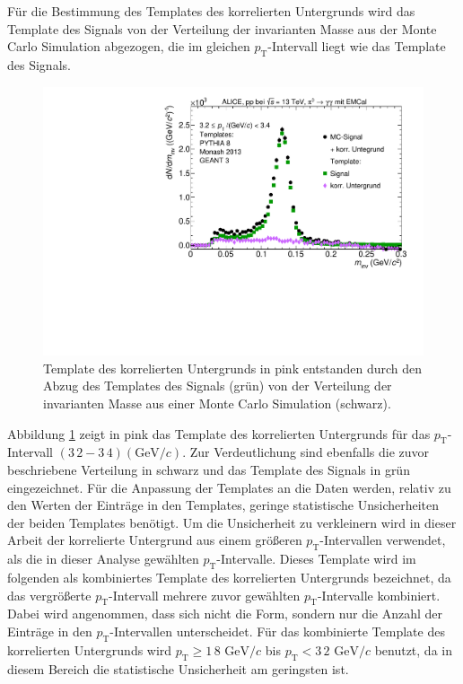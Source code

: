 Für die Bestimmung des Templates des korrelierten Untergrunds wird das Template des Signals von der Verteilung der invarianten Masse aus der Monte Carlo Simulation abgezogen, die im gleichen $p_\text{T}$-Intervall liegt wie das Template des Signals.
\begin{figure}[tp]
\centering
\includegraphics[width=.75\linewidth]{EntstehungUntergrund10_Data_2016.pdf}
\caption{Template des korrelierten Untergrunds in pink entstanden durch den Abzug des Templates des Signals (grün) von der Verteilung der invarianten Masse aus einer Monte Carlo Simulation (schwarz).}
\label{fig:BkgTemp}
\end{figure}
\newline
Abbildung \ref{fig:BkgTemp} zeigt in pink das Template des korrelierten Untergrunds für das $p_\text{T}$-Intervall $(3\,2 - 3\,4) (\text{GeV/}c)$.
Zur Verdeutlichung sind ebenfalls die zuvor beschriebene Verteilung in schwarz und das Template des Signals in grün eingezeichnet.
\newline
Für die Anpassung der Templates an die Daten werden, relativ zu den Werten der Einträge in den Templates, geringe statistische Unsicherheiten der beiden Templates benötigt.
Um die Unsicherheit zu verkleinern wird in dieser Arbeit der korrelierte Untergrund aus einem größeren $p_\text{T}$-Intervallen verwendet, als die in dieser Analyse gewählten $p_\text{T}$-Intervalle.
Dieses Template wird im folgenden als kombiniertes Template des korrelierten Untergrunds bezeichnet, da das vergrößerte $p_\text{T}$-Intervall mehrere zuvor gewählten $p_\text{T}$-Intervalle kombiniert.
Dabei wird angenommen, dass sich nicht die Form, sondern nur die Anzahl der Einträge in den $p_\text{T}$-Intervallen unterscheidet.  
Für das kombinierte Template des korrelierten Untergrunds wird $p_\text{T} \geq 1\,8\text{ GeV}/c$ bis $p_\text{T} < 3\,2\text{ GeV}/c$ benutzt, da in diesem Bereich die statistische Unsicherheit am geringsten ist.
